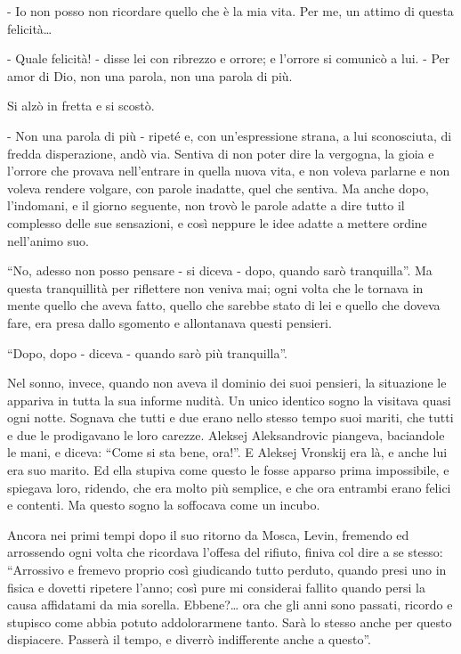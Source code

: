 - Io non posso non ricordare quello che è la mia vita. Per me, un attimo di questa felicità\ldots{} 

- Quale felicità! - disse lei con ribrezzo e orrore; e l'orrore si comunicò a lui. - Per amor di Dio, non una parola, non una parola di più. 

Si alzò in fretta e si scostò. 

- Non una parola di più - ripeté e, con un'espressione strana, a lui sconosciuta, di fredda disperazione, andò via. Sentiva di non poter dire la vergogna, la gioia e l'orrore che provava nell'entrare in quella nuova vita, e non voleva parlarne e non voleva rendere volgare, con parole inadatte, quel che sentiva. Ma anche dopo, l'indomani, e il giorno seguente, non trovò le parole adatte a dire tutto il complesso delle sue sensazioni, e così neppure le idee adatte a mettere ordine nell'animo suo. 

``No, adesso non posso pensare - si diceva - dopo, quando sarò tranquilla''. Ma questa tranquillità per riflettere non veniva mai; ogni volta che le tornava in mente quello che aveva fatto, quello che sarebbe stato di lei e quello che doveva fare, era presa dallo sgomento e allontanava questi pensieri. 

``Dopo, dopo - diceva - quando sarò più tranquilla''. 

Nel sonno, invece, quando non aveva il dominio dei suoi pensieri, la situazione le appariva in tutta la sua informe nudità. Un unico identico sogno la visitava quasi ogni notte. Sognava che tutti e due erano nello stesso tempo suoi mariti, che tutti e due le prodigavano le loro carezze. Aleksej Aleksandrovic piangeva, baciandole le mani, e diceva: ``Come si sta bene, ora!''. E Aleksej Vronskij era là, e anche lui era suo marito. Ed ella stupiva come questo le fosse apparso prima impossibile, e spiegava loro, ridendo, che era molto più semplice, e che ora entrambi erano felici e contenti. Ma questo sogno la soffocava come un incubo. 

\label{xii-1} 

Ancora nei primi tempi dopo il suo ritorno da Mosca, Levin, fremendo ed arrossendo ogni volta che ricordava l'offesa del rifiuto, finiva col dire a se stesso: ``Arrossivo e fremevo proprio così giudicando tutto perduto, quando presi uno in fisica e dovetti ripetere l'anno; così pure mi considerai fallito quando persi la causa affidatami da mia sorella. Ebbene?\ldots{} ora che gli anni sono passati, ricordo e stupisco come abbia potuto addolorarmene tanto. Sarà lo stesso anche per questo dispiacere. Passerà il tempo, e diverrò indifferente anche a questo''. 

